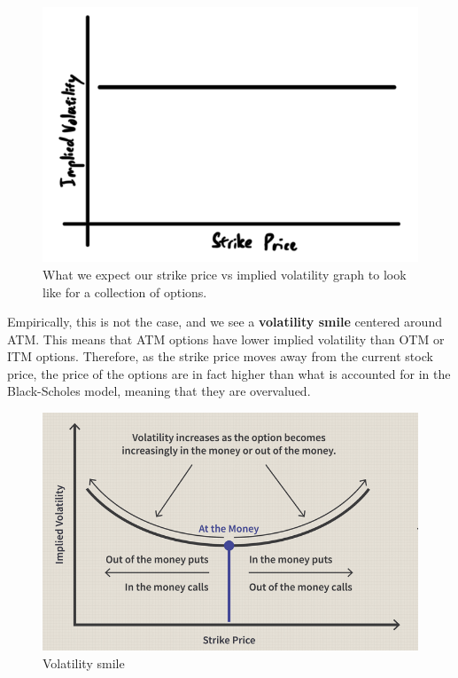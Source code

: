 \documentclass{article}
\begin{document}
    \begin{figure}[H]
      \centering 
      \includegraphics[scale=0.4]{img/expected_vol_graph.png}
      \caption{What we expect our strike price vs implied volatility graph to look like for a collection of options. } 
      \label{fig:expected_volatility_graph}
    \end{figure}

    \begin{definition}
      Empirically, this is not the case, and we see a \textbf{volatility smile} centered around ATM. This means that ATM options have lower implied volatility than OTM or ITM options. Therefore, as the strike price moves away from the current stock price, the price of the options are in fact higher than what is accounted for in the Black-Scholes model, meaning that they are overvalued.  
      \begin{figure}[H]
        \centering 
        \includegraphics[scale=0.4]{img/vol_smile.png}
        \caption{Volatility smile} 
        \label{fig:vol_smile}
      \end{figure}
    \end{definition}
\end{document}

